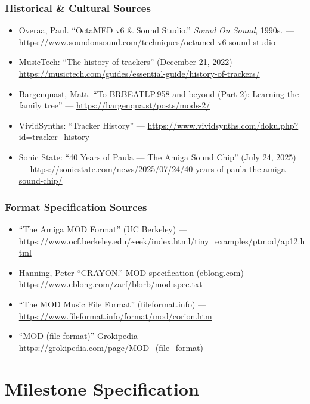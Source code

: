 \documentclass[11pt,letterpaper]{article}
\newcommand{\stageheader}[2]{%
  \noindent\colorbox{#2}{\makebox[\textwidth][l]{%
    \textcolor{white}{\bfseries\sffamily\hspace{6pt}#1\hspace{6pt}}}}%
  \vspace{0.5em}\par%
}
\begin{document}
\subsubsection{Historical \& Cultural Sources}
\begin{itemize}[leftmargin=1.5em]
  \item Overaa, Paul. ``OctaMED v6 \& Sound Studio.'' \textit{Sound On Sound}, 1990s. --- \url{https://www.soundonsound.com/techniques/octamed-v6-sound-studio}
  \item MusicTech: ``The history of trackers'' (December 21, 2022) --- \url{https://musictech.com/guides/essential-guide/history-of-trackers/}
  \item Bargenquast, Matt. ``To BRBEATLP.958 and beyond (Part 2): Learning the family tree'' --- \url{https://bargenqua.st/posts/mods-2/}
  \item VividSynths: ``Tracker History'' --- \url{https://www.vividsynths.com/doku.php?id=tracker_history}
  \item Sonic State: ``40 Years of Paula --- The Amiga Sound Chip'' (July 24, 2025) --- \url{https://sonicstate.com/news/2025/07/24/40-years-of-paula-the-amiga-sound-chip/}
\end{itemize}

\subsubsection{Format Specification Sources}
\begin{itemize}[leftmargin=1.5em]
  \item ``The Amiga MOD Format'' (UC Berkeley) --- \url{https://www.ocf.berkeley.edu/~eek/index.html/tiny_examples/ptmod/ap12.html}
  \item Hanning, Peter ``CRAYON.'' MOD specification (eblong.com) --- \url{https://www.eblong.com/zarf/blorb/mod-spec.txt}
  \item ``The MOD Music File Format'' (fileformat.info) --- \url{https://www.fileformat.info/format/mod/corion.htm}
  \item ``MOD (file format)'' Grokipedia --- \url{https://grokipedia.com/page/MOD_(file_format)}
\end{itemize}

\newpage
\stageheader{STAGE 3 --- MISSION PACKAGE}{tertiary}

\section{Milestone Specification}
\end{document}
